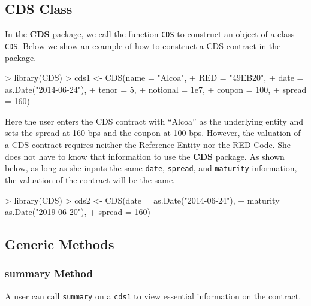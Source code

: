 \documentclass{jss}
\begin{document}
\subsection{CDS Class}
\label{class:CDS}

In the \textbf{CDS} package, we call the function \texttt{CDS} to construct an object of a class \texttt{CDS}. Below we show an example of how to construct a CDS contract in the package.

\begin{Schunk}
\begin{Sinput}
> library(CDS)
> cds1 <- CDS(name     = "Alcoa",
+             RED      = "49EB20",
+             date     = as.Date("2014-06-24"),
+             tenor    = 5,
+             notional = 1e7,
+             coupon   = 100,
+             spread   = 160)
\end{Sinput}
\end{Schunk}

Here the user enters the CDS contract with ``Alcoa'' as the underlying entity and sets the spread at 160 bps and the coupon at 100 bps. However, the valuation of a CDS contract requires neither the Reference Entity nor the RED Code. She does not have to know that information to use the \textbf{CDS} package. As shown below, as long as she inputs the same \texttt{date}, \texttt{spread}, and \texttt{maturity} information, the valuation of the contract will be the same.

\begin{Schunk}
\begin{Sinput}
> library(CDS)
> cds2 <- CDS(date     = as.Date("2014-06-24"),
+             maturity = as.Date("2019-06-20"),
+             spread   = 160)
\end{Sinput}
\end{Schunk}

\subsection{Generic Methods}
\label{sec:GenericMethods}

\subsubsection{summary Method}
\label{sec:SummaryFunction}

A user can call \texttt{summary} on a \texttt{cds1} to view essential information on the contract.
\end{document}
